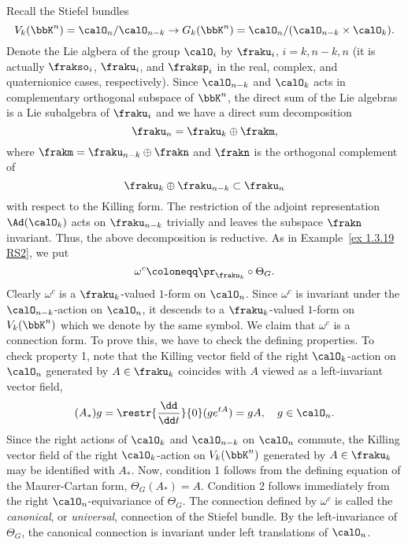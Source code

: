 \begin{example}
    Recall the Stiefel bundles
    \[V_k(\bbK^n)=\calO_n\slash \calO_{n-k}\to G_k(\bbK^n)=\calO_n\slash (\calO_{n-k}\times\calO_k).\]
    Denote the Lie algbera of the group $\calO_i$ by $\fraku_i$, $i=k,n-k,n$ (it is actually $\frakso_i$, $\fraku_i$, and $\fraksp_i$ in the real, complex, and quaternionice cases, respectively). Since $\calO_{n-k}$ and $\calO_k$ acts in complementary orthogonal subspace of $\bbK^n$, the direct sum of the Lie algebras is a Lie subalgebra of $\fraku_i$ and we have a direct sum decomposition
    \[\fraku_n=\fraku_k\oplus\frakm,\]
    where $\frakm=\fraku_{n-k}\oplus\frakn$ and $\frakn$ is the orthogonal complement of
    \[\fraku_k\oplus\fraku_{n-k}\subset \fraku_n\]
    with respect to the Killing form. The restriction of the adjoint representation $\Ad(\calO_k)$ acts on $\fraku_{n-k}$ trivially and leaves the subspace $\frakn$ invariant. Thus, the above decomposition is reductive. As in Example~\ref{ex 1.3.19 RS2}, we put
    \[\omega^c\coloneqq \pr_{\fraku_k}\circ\Theta_G.\]
    Clearly $\omega^c$ is a $\fraku_k$-valued $1$-form on $\calO_n$. Since $\omega^c$ is invariant under the $\calO_{n-k}$-action on $\calO_n$, it descends to a $\fraku_k$-valued $1$-form on $V_k(\bbK^n)$ which we denote by the same symbol. We claim that $\omega^c$ is a connection form. To prove this, we have to check the defining properties. To check property 1, note that the Killing vector field of the right $\calO_k$-action on $\calO_n$ generated by $A\in \fraku_k$ coincides with $A$ viewed as a left-invariant vector field,
    \[(A_\ast)g=\restr{\frac{\dd}{\dd t}}{0}(g e^{tA})=gA,\quad g\in\calO_n.\]
    Since the right actions of $\calO_k$ and $\calO_{n-k}$ on $\calO_n$ commute, the Killing vector field of the right $\calO_k$-action on $V_k(\bbK^n)$ generated by $A\in\fraku_k$ may be identified with $A_\ast$. Now, condition 1 follows from the defining equation of the Maurer-Cartan form, $\Theta_G(A_\ast)=A$. Condition 2 follows immediately from the right $\calO_n$-equivariance of $\Theta_G$. The connection defined by $\omega^c$ is called the \emph{canonical}, or \emph{universal}, connection of the Stiefel bundle. By the left-invariance of $\Theta_G$, the canonical connection is invariant under left translations of $\calO_n$.


\end{example}
